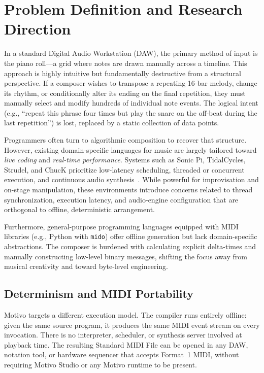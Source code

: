 \section{Problem Definition and Research Direction}\label{sec:problem-direction}

In a standard Digital Audio Workstation (DAW), the primary method of input is the piano roll---a grid where notes are
drawn manually across a timeline.
This approach is highly intuitive but fundamentally destructive from a structural perspective.
If a composer wishes to transpose a repeating 16-bar melody, change its rhythm, or conditionally alter its ending on the
final repetition, they must manually select and modify hundreds of individual note events.
The logical intent (e.g., ``repeat this phrase four times but play the snare on the off-beat during the last
repetition'') is lost, replaced by a static collection of data points.

Programmers often turn to algorithmic composition to recover that structure.
However, existing domain-specific languages for music are largely tailored toward \textit{live coding} and
\textit{real-time performance}.
Systems such as Sonic Pi, TidalCycles, Strudel, and ChucK prioritize low-latency scheduling, threaded or concurrent
execution, and continuous audio synthesis~\cite{Aaron_2016,McLean_Wiggins_2010,Roos_McLean_2023,Wang_Cook_2003}.
While powerful for improvisation and on-stage manipulation, these environments introduce concerns related to thread
synchronization, execution latency, and audio-engine configuration that are orthogonal to offline, deterministic
arrangement.

Furthermore, general-purpose programming languages equipped with MIDI libraries (e.g., Python with \texttt{mido}) offer
offline generation but lack domain-specific abstractions.
The composer is burdened with calculating explicit delta-times and manually constructing low-level binary messages,
shifting the focus away from musical creativity and toward byte-level engineering.

\subsection{Determinism and MIDI Portability}\label{subsec:determinism-portability}

Motivo targets a different execution model.
The compiler runs entirely offline: given the same source program, it produces the same MIDI event stream on every
invocation.
There is no interpreter, scheduler, or synthesis server involved at playback time.
The resulting Standard MIDI File can be opened in any DAW, notation tool, or hardware sequencer that accepts Format~1
MIDI, without requiring Motivo Studio or any Motivo runtime to be present.

